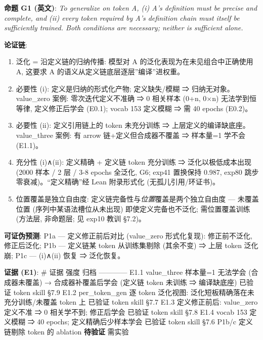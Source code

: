 \documentclass[
]{article}
\providecommand{\tightlist}{%
  \setlength{\itemsep}{0pt}\setlength{\parskip}{0pt}}
\begin{document}
\textbf{命题 G1 (英文)}: \emph{To generalize on token A, (i) A's
definition must be precise and complete, and (ii) every token required
by A's definition chain must itself be sufficiently trained. Both
conditions are necessary; neither is sufficient alone.}

\textbf{论证链}:

\begin{enumerate}
\def\labelenumi{\arabic{enumi}.}
\tightlist
\item
  泛化 = 沿定义链的归纳传播: 模型对 A 的泛化表现为在未见组合中正确使用
  A, 这要求 A 的语义从定义链底层逐层''编译''进权重。
\item
  必要性 (i): 定义是归纳的形式化产物; 定义缺失/模糊 ⇒
  归纳无对象。value\_zero 案例: 零次迭代定义不准确 ⇒ 0 相关样本 (0+n,
  0×n) 无法学到恒等律, 定义修正后学会 (E0.1); vocab 153 定义模糊 ⇒ 需 40
  epochs (E0.2)。
\item
  必要性 (ii): 定义引用链上的 token 未充分训练 ⇒
  上层定义的编译缺底座。value\_three 案例: 有 arrow
  链+定义但合成器不覆盖 ⇒ 样本量=1 学不会 (E1.1)。
\item
  充分性 (i)∧(ii): 定义精确 + 定义链 token 充分训练 ⇒ 泛化以极低成本出现
  (2000 样本 / 2 层 / 3-8 epochs 全泛化, G6; exp41 置换保持 0.987, exp80
  跳步零衰减)。``定义精确''经 Lean 附录形式化 (无孤儿引用/环证书)。
\item
  位置覆盖是独立自由度: 定义链完备性与\emph{位置}覆盖是两个独立自由度
  --- 未覆盖位置 (序列中某语法槽位从未出现) 即使定义完备也不泛化;
  需位置覆盖训练 (方法层, 非命题层; 见 exp10 教训 §7.2)。
\end{enumerate}

\textbf{可证伪预测}: P1a --- 定义修正前后对比 (value\_zero 形式化复现):
修正前不泛化, 修正后泛化; P1b --- 定义链某 token 从训练集剔除 (其余不变)
⇒ 上层 token 泛化崩; P1c --- (i)∧(ii) 恢复 ⇒ 泛化恢复。

\textbf{证据 (E1)}: \textbar{} \# \textbar{} 证据 \textbar{} 强度
\textbar{} 归档 \textbar{}
\textbar---\textbar---\textbar---\textbar---\textbar{} \textbar{} E1.1
\textbar{} value\_three 样本量=1 无法学会 (合成器未覆盖) →
合成器补覆盖后学会 (定义链 token 未训练 ⇒ 编译缺底座) \textbar{} 已验证
\textbar{} token skill §7.9 \textbar{} \textbar{} E1.2 \textbar{}
per\_token\_gen 逐 token 泛化视图: 泛化短板精确落在未充分训练/未覆盖
token 上 \textbar{} 已验证 \textbar{} token skill §7.7 \textbar{}
\textbar{} E1.3 \textbar{} 定义修正前后: value\_zero 定义不准 ⇒ 0
相关学不到; 修正后学会 \textbar{} 已验证 \textbar{} token skill §7.8
\textbar{} \textbar{} E1.4 \textbar{} vocab 153 定义模糊 ⇒ 40 epochs;
定义精确后少样本学会 \textbar{} 已验证 \textbar{} token skill §7.6
\textbar{} \textbar{} P1b/c \textbar{} 定义链剔除 token 的 ablation
\textbar{} \textbf{待验证} \textbar{} 需实验 \textbar{}
\end{document}
